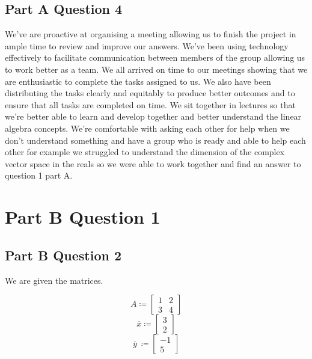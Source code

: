 \documentclass{article}
\begin{document}
\subsection*{Part A Question 4}
We've are proactive at organising a meeting allowing us to finish the project in ample time to review and improve our answers. We've been using technology effectively to facilitate communication between members of the group allowing us to work better as a team. We all arrived on time to our meetings showing that we are enthusiastic to complete the tasks assigned to us. We also have been distributing the tasks clearly and equitably to produce better outcomes and to ensure that all tasks are completed on time. We sit together in lectures so that we're better able to learn and develop together and better understand the linear algebra concepts. We're comfortable with asking each other for help when we don't understand something and have a group who is ready and able to help each other for example we struggled to understand the dimension of the complex vector space in the reals so we were able to work together and find an answer to question 1 part A.

\break

\section{Part B Question 1}

\subsection{Part B Question 2}
We are given the matrices.

\begin{equation*}
    A  \coloneqq \begin{bmatrix}
        1 & 2\\3&4 
    \end{bmatrix}
\end{equation*}
\begin{equation*}
    \overline{x}  \coloneqq \begin{bmatrix}
        3 \\ 2
    \end{bmatrix}
\end{equation*}
\begin{equation*}
    \overline{y} \ \coloneqq \begin{bmatrix}
        -1 \\ 5
    \end{bmatrix} 
\end{equation*}
\end{document}
